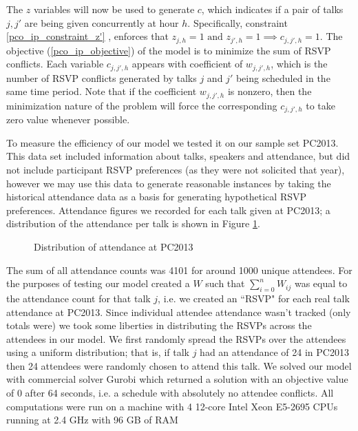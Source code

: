 \documentclass{svjour3}                     %
\begin{document}
The $z$ variables will now be used to generate $c$, which indicates if a pair of talks $j,j'$ are being given concurrently at hour $h$. 
Specifically, constraint \ref{pco_ip_constraint_z'} , enforces that $z_{j,h} = 1 \text{ and } z_{j',h} = 1 \implies c_{j,j',h}=1$. 
The objective (\ref{pco_ip_objective}) of the model is to minimize the sum of RSVP conflicts.
Each variable $c_{j,j',h}$ appears with coefficient of $w_{j,j',h}$, which is the number of RSVP conflicts generated by talks $j$ and $j'$ being scheduled in the same time period.
Note that if the coefficient $w_{j,j',h}$ is nonzero, then the minimization nature of the problem will force the corresponding $c_{j,j',h}$ to take zero value whenever possible.

To measure the efficiency of our model we tested it on our sample set PC2013. 
This data set included information about talks, speakers and attendance, but did not include participant RSVP preferences (as they were not solicited that year), however we may use this data to generate reasonable instances by taking the historical attendance data as a basis for generating hypothetical RSVP preferences.
Attendance figures we recorded for each talk given at PC2013; a distribution of the attendance per talk is shown in Figure \ref{2013_attendance_distribution}.
\begin{figure}[h!]
	\caption{Distribution of attendance at PC2013}
	\centering
	
	\label{2013_attendance_distribution}
\end{figure}
The sum of all attendance counts was 4101 \cite{pc2013_attendance} for around 1000 unique attendees. 
For the purposes of testing our model created a $W$ such that $\sum\limits_{i=0}^{n} W_{ij}$ was equal to the attendance count for that talk $j$, i.e. we created an ``RSVP" for each real talk attendance at PC2013. 
Since individual attendee attendance wasn't tracked (only totals were) we took some liberties in distributing the RSVPs across the attendees in our model. 
We first randomly spread the RSVPs over the attendees using a uniform distribution; that is, if talk $j$ had an attendance of 24 in PC2013 then 24 attendees were randomly chosen to attend this talk. 
We solved our model with commercial solver Gurobi which returned a solution with an objective value of 0 after 64 seconds, i.e. a schedule with absolutely no attendee conflicts.
All computations were run on a machine with 4 12-core Intel Xeon E5-2695 CPUs running at 2.4 GHz with 96 GB of RAM
\end{document}
